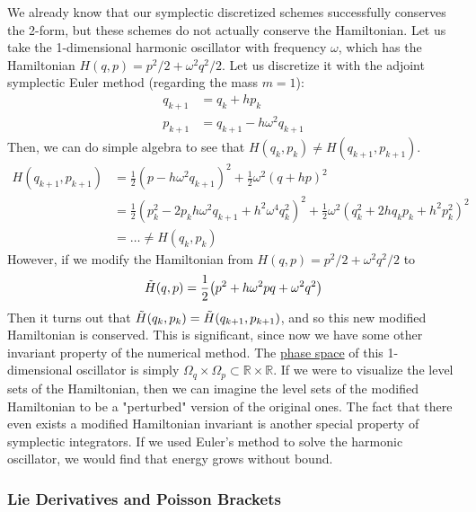     We already know that our symplectic discretized schemes successfully conserves the 2-form, but these schemes do not actually conserve the Hamiltonian. Let us take the 1-dimensional harmonic oscillator with frequency $\omega$, which has the Hamiltonian $H(q, p) = p^2/2 + \omega^2 q^2/2$. Let us discretize it with the adjoint symplectic Euler method (regarding the mass $m = 1$): 
    \begin{align*}
      q_{k+1} & = q_k + h p_k \\ 
      p_{k+1} & = q_{k+1} - h \omega^2 q_{k+1}
    \end{align*}
    Then, we can do simple algebra to see that $H(q_k, p_k) \neq H(q_{k+1}, p_{k+1})$. 
    \begin{align*}
      H(q_{k+1}, p_{k+1}) & = \frac{1}{2} (p - h \omega^2 q_{k+1})^2 + \frac{1}{2} \omega^2 (q + h p)^2 \\
      & = \frac{1}{2} (p_k^2 - 2p_kh \omega^2 q_{k+1} + h^2 \omega^4 q_k^2)^2 + \frac{1}{2} \omega^2 (q_k^2 + 2hq_k p_k + h^2 p_k^2)^2 \\
      &  = \ldots \neq H(q_k, p_k) 
    \end{align*}
    However, if we modify the Hamiltonian from $H(q, p) = p^2 /2 + \omega^2 q^2 / 2$ to 
    \begin{equation}
      \Tilde{H} (q, p) = \frac{1}{2} \big( p^2 + h \omega^2 p q + \omega^2 q^2 \big)
    \end{equation}
    Then it turns out that $\Tilde{H}(q_k, p_k) = \Tilde{H}(q_{k+1}, p_{k+1})$, and so this new modified Hamiltonian is conserved. This is significant, since now we have some other invariant property of the numerical method. The \hyperref[ode-def:phase-space]{phase space} of this 1-dimensional oscillator is simply $\Omega_q \times \Omega_p \subset \mathbb{R} \times \mathbb{R}$. If we were to visualize the level sets of the Hamiltonian, then we can imagine the level sets of the modified Hamiltonian to be a "perturbed" version of the original ones. The fact that there even exists a modified Hamiltonian invariant is another special property of symplectic integrators. If we used Euler's method to solve the harmonic oscillator, we would find that energy grows without bound. 

    \subsubsection{Lie Derivatives and Poisson Brackets}

